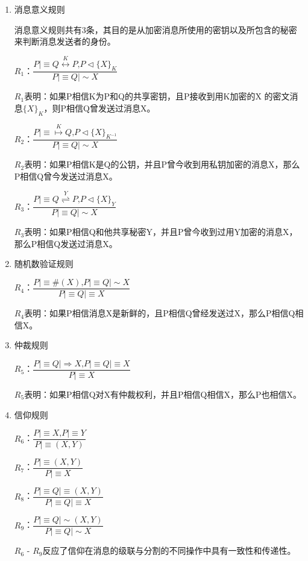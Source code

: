 \documentclass[cs4size,a4pape,UTF8]{ctexart}
\numberwithin{equation}{section}
\numberwithin{table}{section}
\numberwithin{figure}{section}
\begin{document}
\begin{enumerate}[(1)]
\item 消息意义规则

消息意义规则共有3条，其目的是从加密消息所使用的密钥以及所包含的秘密来判断消息发送者的身份。

$R_{1}$：$\dfrac{P{\lvert\equiv}Q\stackrel{K}{\longleftrightarrow}P\textrm{,}P\triangleleft\{X\}_{K}}{P{\lvert\equiv}Q{\lvert\sim}X}$

$R_{1}$表明：如果P相信K为P和Q的共享密钥，且P接收到用K加密的X 的密文消息$\{X\}_{K}$，则P相信Q曾发送过消息X。

$R_{2}$：$\dfrac{P{\lvert\equiv}\stackrel{K}{\mapsto}Q\textrm{,} P\triangleleft\{X\}_{K^{-1}}}{P{\lvert\equiv}Q{\lvert\sim}X}$

$R_{2}$表明：如果P相信K是Q的公钥，并且P曾今收到用私钥加密的消息X，那么P相信Q曾今发送过消息X。

$R_{3}$：$\dfrac{P{\lvert\equiv}Q\stackrel{Y}{\rightleftharpoons}P\textrm{,} P\triangleleft\{X\}_{Y}}{P{\lvert\equiv}Q{\lvert\sim}X}$

$R_{3}$表明：如果P相信Q和他共享秘密Y，并且P曾今收到过用Y加密的消息X，那么P相信Q发送过消息X。

\item 随机数验证规则

$R_{4}$：$\dfrac{P{\lvert\equiv}\#(X)\textrm{,} P{\lvert\equiv}Q{\lvert\sim}X}{P{\lvert\equiv}Q{\lvert\equiv}X}$

$R_{4}$表明：如果P相信消息X是新鲜的，且P相信Q曾经发送过X，那么P相信Q相信X。

\item 仲裁规则

$R_{5}$：$\dfrac{P{\lvert\equiv}Q{\lvert\Rightarrow}X\textrm{,} P{\lvert\equiv}Q{\lvert\equiv}X}{P{\lvert\equiv}X}$

$R_{5}$表明：如果P相信Q对X有仲裁权利，并且P相信Q相信X，那么P也相信X。

\item 信仰规则

$R_{6}$：$\dfrac{P{\lvert\equiv}X\textrm{,} P{\lvert\equiv}Y}{P{\lvert\equiv}(X,Y)}$

$R_{7}$：$\dfrac{P{\lvert\equiv}(X,Y)}{P{\lvert\equiv}X}$

$R_{8}$：$\dfrac{P{\lvert\equiv}Q{\lvert\equiv}(X,Y)}{P{\lvert\equiv}Q{\lvert\equiv}X}$

$R_{9}$：$\dfrac{P{\lvert\equiv}Q{\lvert\sim}(X,Y)}{P{\lvert\equiv}Q{\lvert\sim}X}$

$R_{6}$ - $R_{9}$反应了信仰在消息的级联与分割的不同操作中具有一致性和传递性。


\end{enumerate}
\end{document}
